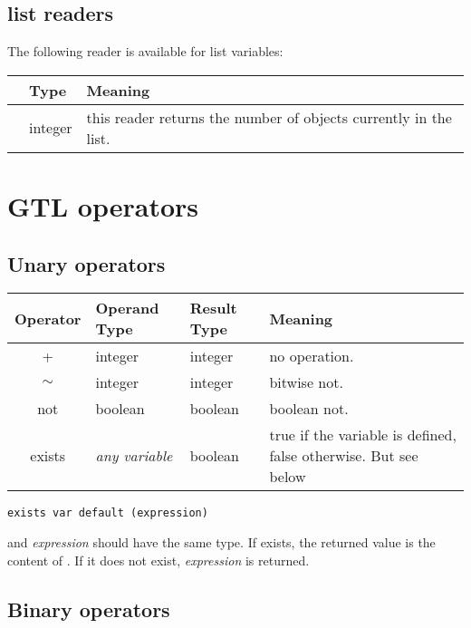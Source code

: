 \subsection{list readers}

The following reader is available for list variables:

\begin{longtable}{>{\ttfamily}l|l|p{4.395in}}
{\bf Item}&{\bf Type}&{\bf Meaning}\\
\hline\endhead
 {length}&
  {integer}&
  {this reader returns the number of objects currently in the list.}\\
\end{longtable}

\section{GTL operators}

\subsection{Unary operators}

\begin{longtable}{c|l|l|p{2.56in}}
{\bf Operator}&{\bf Operand Type}&{\bf Result Type}&{\bf Meaning}\\
\hline\endhead
 {+}&
  {integer}&
  {integer}&
  {no operation.}\\
 {$\sim$}&
  {integer}&
  {integer}&
  {bitwise not.}\\
 {not}&
  {boolean}&
  {boolean}&
  {boolean not.}\\
 {exists}&
  {{\em any variable}}&
  {boolean}&
  {true if the variable is defined, false otherwise. But see below}\\
\end{longtable}

 
\begin{lstlisting}[language=goilTemplate]
exists var default (expression)
\end{lstlisting}

 and {\em expression} should have the same type. If  exists, the returned value is the content of . If it does not exist, {\em expression} is returned.


\subsection{Binary operators}

